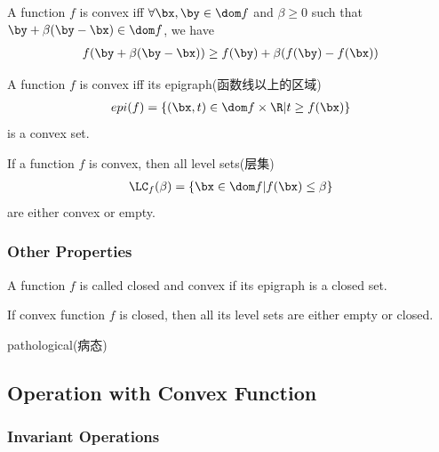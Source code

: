 \begin{theorem}
    A function $f$ is convex iff $\forall \bx, \by \in \dom f$ and $\beta\ge 0$ such that $\by+\beta(\by-\bx)\in\dom f$, we have
    \begin{align*}
        f(\by+\beta(\by-\bx))\ge f(\by)+\beta (f(\by)-f(\bx))
    \end{align*}
\end{theorem}

\begin{theorem}
    A function $f$ is convex iff its epigraph(函数线以上的区域)
    \begin{align*}
        epi(f)=\left\{ (\bx,t)\in \dom f\times \R | t\ge f(\bx) \right\}
    \end{align*}
    is a convex set. 
\end{theorem}

\begin{theorem}
    If a function $f$ is convex, then all level sets(层集)
    \begin{align*}
        \LC_f(\beta)=\left\{ \bx \in \dom f| f(\bx)\le \beta \right\}
    \end{align*}
    are either convex or empty. 
\end{theorem}

\subsubsection{Other Properties}
\begin{definition}
    A function $f$ is called closed and convex if its epigraph is a closed set.
\end{definition}
\begin{theorem}
    If convex function $f$ is closed, then all its level sets are either empty or closed. 
\end{theorem}

pathological(病态)

\subsection{Operation with Convex Function}
\subsubsection{Invariant Operations}

